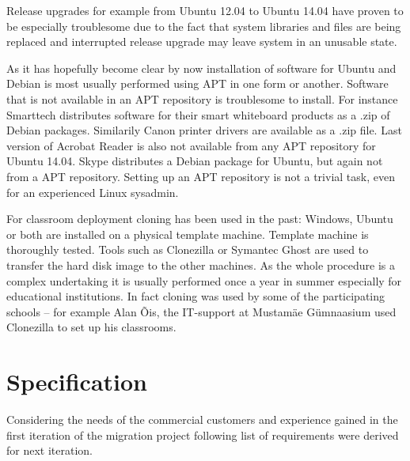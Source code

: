 \documentclass[a4paper,11pt]{kth-mag}
\begin{document}
Release upgrades for example from Ubuntu 12.04 to Ubuntu 14.04
have proven to be especially troublesome due to the fact that system libraries
and files are being replaced and interrupted release upgrade may leave system
in an unusable state.

As it has hopefully become clear by now
installation of software for Ubuntu and Debian
is most usually performed using APT in one form or another.
Software that is not available in an APT repository
is troublesome to install.
For instance Smarttech distributes software for their smart
whiteboard products as a .zip of Debian packages.
Similarily Canon printer drivers are available as a .zip file.
Last version of Acrobat Reader is also not available
from any APT repository for Ubuntu 14.04.
Skype distributes a Debian package for Ubuntu, but again
not from a APT repository.
Setting up an APT repository is not a trivial task,
even for an experienced Linux sysadmin.


For classroom deployment cloning has been used in the past:
Windows, Ubuntu or both are installed on a physical template machine.
Template machine is thoroughly tested.
Tools such as Clonezilla \cite{clonezilla} or Symantec Ghost are used to transfer the
hard disk image to the other machines.
As the whole procedure is a complex undertaking
it is usually performed once a year in summer especially for
educational institutions.
In fact cloning was used by some of the participating
schools -- for example Alan Õis, the IT-support at Mustamäe Gümnaasium
used Clonezilla to set up his classrooms.





\section{Specification}

Considering the needs of the commercial customers and
experience gained in the first iteration of the migration project
following list of requirements were derived for next iteration.
\end{document}
